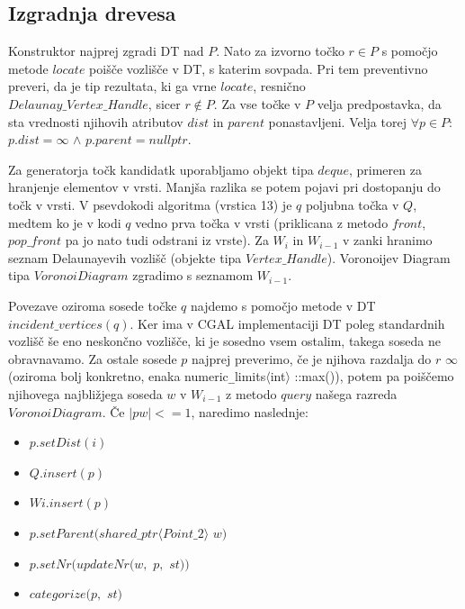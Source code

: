\documentclass[a4paper, 12pt]{book}
\begin{document}
\subsection{Izgradnja drevesa} 

Konstruktor najprej zgradi DT nad $P$. Nato za izvorno točko $r\in P$ s pomočjo metode $locate$ poišče vozlišče v DT, s katerim sovpada. Pri tem preventivno preveri, da je tip rezultata, ki ga vrne $locate$, resnično \\ 
$Delaunay\texttt{\_}Vertex\texttt{\_}Handle$, sicer $r\notin P$. Za vse točke v $P$ velja predpostavka, da sta vrednosti njihovih atributov $dist$ in $parent$ ponastavljeni. Velja torej $\forall p\in P:$ $p.dist = \infty$ $\wedge$ $p.parent = nullptr$. 

Za generatorja točk kandidatk uporabljamo objekt tipa $deque$, primeren za hranjenje elementov v vrsti. Manjša razlika se potem pojavi pri dostopanju do točk v vrsti. V psevdokodi algoritma (vrstica 13) je $q$ poljubna točka v $Q$, medtem ko je v kodi $q$ vedno prva točka v vrsti (priklicana z metodo $front$, $pop\texttt{\_}front$ pa jo nato tudi odstrani iz vrste). Za $W_i$ in $W_{i-1}$ v zanki hranimo seznam Delaunayevih vozlišč (objekte tipa $Vertex\texttt{\_}Handle$). Voronoijev Diagram tipa $VoronoiDiagram$ zgradimo s seznamom $W_{i-1}$.

Povezave oziroma sosede točke $q$ najdemo s pomočjo metode v DT \\ $incident\texttt{\_}vertices(q)$. Ker ima v CGAL implementaciji DT poleg standardnih vozlišč še eno neskončno vozlišče, ki je sosedno vsem ostalim, takega soseda ne obravnavamo. Za ostale sosede $p$ najprej preverimo, če je njihova razdalja do $r$ $\infty$ (oziroma bolj konkretno, enaka numeric\texttt{\_}limits$\langle$int$\rangle$ ::max()), potem pa poiščemo njihovega najbližjega soseda $w$ v $W_{i-1}$ z metodo $query$ našega razreda $VoronoiDiagram$. Če $|pw| <= 1$, naredimo naslednje:

\begin{itemize}
\item $p.setDist(i)$
\item $Q.insert(p)$
\item $Wi.insert(p)$
\item $p.setParent(shared\texttt{\_}ptr\langle Point\texttt{\_}2\rangle  $ $w)$
\item $p.setNr(updateNr(w,$ $p,$ $st))$
\item $categorize(p,$ $st)$
\end{itemize}
\end{document}
